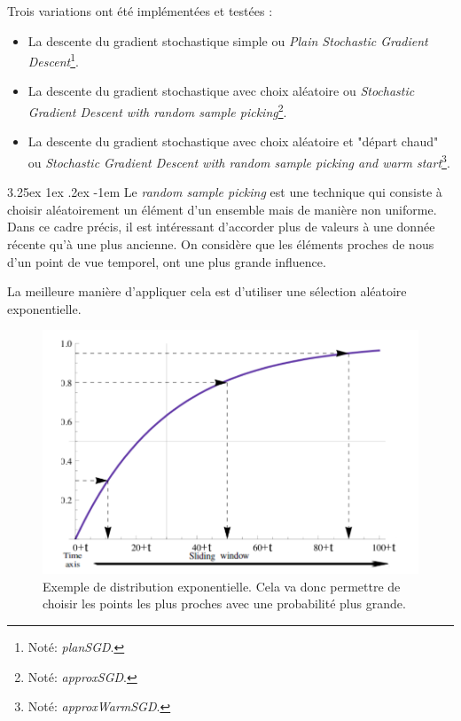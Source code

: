 \documentclass[a4paper, 11pt]{article}
\makeatletter
\renewcommand\paragraph{\@startsection{paragraph}{5}{\z@}%
  {3.25ex \@plus1ex \@minus.2ex}%
  {-1em}%
  {\normalfont\normalsize\bfseries}}
\makeatother
\begin{document}
Trois variations ont été implémentées et testées :
\begin{itemize}
\item La descente du gradient stochastique simple ou \textit{Plain Stochastic Gradient Descent}\footnote{Noté: \textit{planSGD}.}.
\item La descente du gradient stochastique avec choix aléatoire ou \textit{Stochastic Gradient Descent with random sample picking}\footnote{Noté: \textit{approxSGD}.}.
\item La descente du gradient stochastique avec choix aléatoire et "départ chaud" ou \textit{Stochastic Gradient Descent with random sample picking and warm start}\footnote{Noté: \textit{approxWarmSGD}.}.
\end{itemize}

\paragraph{}
Le \textit{random sample picking} est une technique qui consiste à choisir aléatoirement un élément d'un ensemble mais de manière non uniforme. Dans ce cadre précis, il est intéressant d'accorder plus de valeurs à une donnée récente qu'à une plus ancienne. On considère que les éléments proches de nous d'un point de vue temporel, ont une plus grande influence.

La meilleure manière d'appliquer cela est d'utiliser une sélection aléatoire exponentielle.

\begin{figure}[H]
\centering
\includegraphics[scale=0.40]{images/choix_exp}
\caption[]{Exemple de distribution exponentielle\footnotemark. Cela va donc permettre de choisir les points les plus proches avec une probabilité plus grande.}
\end{figure}
\end{document}
